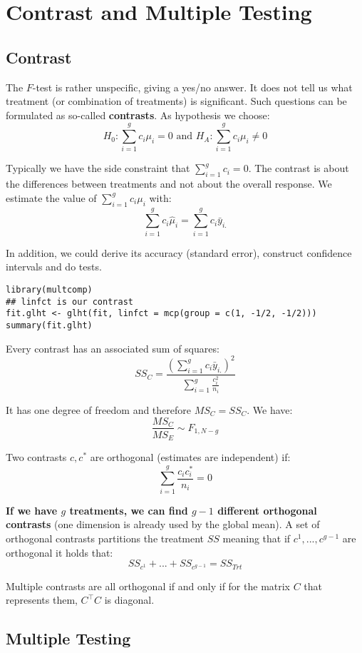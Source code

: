 \section{Contrast and Multiple Testing}

\subsection{Contrast}

The $F$-test is rather unspecific, giving a yes/no answer. It does not tell us what treatment (or combination of treatments) is significant. Such questions can be formulated as so-called \textbf{contrasts}. As hypothesis we choose:
$$H_0 : \sum_{i=1}^g c_i \mu_i = 0 \text{ and } H_A : \sum_{i=1}^g c_i \mu_i \neq 0$$

Typically we have the side constraint that $\sum_{i=1}^g c_i = 0$. The contrast is about the differences between treatments and not about the overall response. We estimate the value of $\sum_{i=1}^g c_i \mu_i$ with:
$$\sum_{i=1}^g c_i \hat \mu_i = \sum_{i=1}^g c_i \bar y_{i.}$$

In addition, we could derive its accuracy (standard error), construct confidence intervals and do tests.

\begin{lstlisting}
library(multcomp)
## linfct is our contrast
fit.glht <- glht(fit, linfct = mcp(group = c(1, -1/2, -1/2)))
summary(fit.glht)
\end{lstlisting}

Every contrast has an associated sum of squares:
$$SS_C = \frac{(\sum_{i=1}^g c_i \bar y_{i.})^2}{\sum_{i=1}^g \frac{c_i^2}{n_i}}$$	

It has one degree of freedom and therefore $MS_C = SS_C$. We have:
$$\frac{MS_C}{MS_E} \sim F_{1, N-g}$$

Two contrasts $c, c^*$ are orthogonal (estimates are independent) if:
$$\sum_{i=1}^g \frac{c_i c_i^*}{n_i} = 0$$

\textbf{If we have $g$ treatments, we can find $g - 1$ different orthogonal contrasts} (one dimension is already used by the global mean). A set of orthogonal contrasts partitions the treatment $SS$ meaning that if $c^1, ..., c^{g-1}$ are orthogonal it holds that:
$$SS_{c^1} + ... + SS_{c^{g-1}} = SS_{Trt}$$

Multiple contrasts are all orthogonal if and only if for the matrix $C$ that represents them, $C^\top C$ is diagonal. \medskip


\subsection{Multiple Testing}

